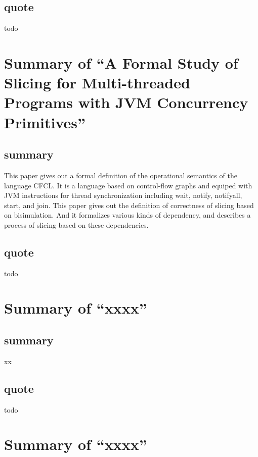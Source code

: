 \documentclass{llncs}
\begin{document}
\subsection{quote}
todo


\section{Summary of ``A Formal Study of Slicing for Multi-threaded Programs with JVM
Concurrency Primitives''\cite{xxxxxxx}} 
  \label{section:slicing_jvm}
\subsection{summary}
This paper gives out a formal definition of the operational semantics of the language
CFCL. It is a language based on control-flow graphs and equiped with JVM instructions 
for thread synchronization including wait, notify, notifyall, start, and join. This
paper gives out the definition of correctness of slicing based on bisimulation. And it
formalizes various kinds of dependency, and describes a process of slicing based on
these dependencies.

\subsection{quote}
todo


\section{Summary of ``xxxx''\cite{xxxxxxx}} 
  \label{section:xxxxxx}
\subsection{summary}
xx

\subsection{quote}
todo



\section{Summary of ``xxxx''\cite{xxxxxxx}} 
  \label{section:xxxxxx}
\end{document}
